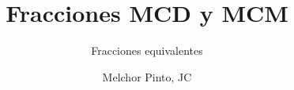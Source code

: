 \documentclass{guia}
\title{Fracciones MCD y MCM}
\subtitle{Fracciones equivalentes}
\author{Melchor Pinto, JC}
\begin{document}
%
\begin{questions}
\questionboxed{}
\end{questions}
\end{document}

